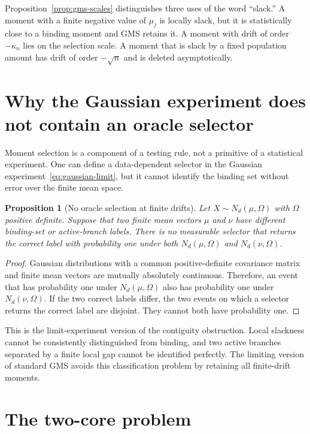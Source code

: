 \documentclass[12pt]{article}
\newtheorem{proposition}{Proposition}
\theoremstyle{remark}
\begin{document}
Proposition~\ref{prop:gms-scales} distinguishes three uses of the word
``slack.''  A moment with a finite negative value of $\mu_j$ is locally slack,
but it is statistically close to a binding moment and GMS retains it.  A
moment with drift of order $-\kappa_n$ lies on the selection scale.  A moment
that is slack by a fixed population amount has drift of order $-\sqrt n$ and
is deleted asymptotically.

\section{Why the Gaussian experiment does not contain an oracle selector}

Moment selection is a component of a testing rule, not a primitive of a
statistical experiment.  One can define a data-dependent selector in the
Gaussian experiment~\eqref{eq:gaussian-limit}, but it cannot identify the
binding set without error over the finite mean space.

\begin{proposition}[No oracle selection at finite drifts]
Let $X\sim N_d(\mu,\Omega)$ with $\Omega$ positive definite.  Suppose that two
finite mean vectors $\mu$ and $\nu$ have different binding-set or active-branch
labels.  There is no measurable selector that returns the correct label with
probability one under both $N_d(\mu,\Omega)$ and $N_d(\nu,\Omega)$.
\end{proposition}

\begin{proof}
Gaussian distributions with a common positive-definite covariance matrix and
finite mean vectors are mutually absolutely continuous.  Therefore, an event
that has probability one under $N_d(\mu,\Omega)$ also has probability one
under $N_d(\nu,\Omega)$.  If the two correct labels differ, the two events on
which a selector returns the correct label are disjoint.  They cannot both
have probability one.
\end{proof}

This is the limit-experiment version of the contiguity obstruction.  Local
slackness cannot be consistently distinguished from binding, and two active
branches separated by a finite local gap cannot be identified perfectly.
The limiting version of standard GMS avoids this classification problem by
retaining all finite-drift moments.

\section{The two-core problem}
\end{document}
